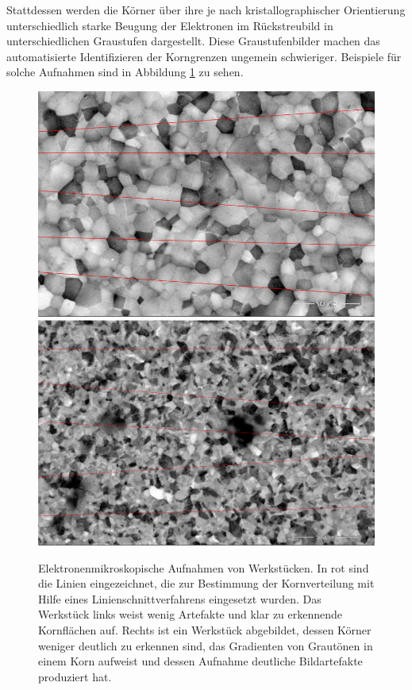\documentclass[
  12pt,
  openany]{book}
\begin{document}
Stattdessen werden die Körner über ihre je nach kristallographischer Orientierung unterschiedlich starke Beugung der Elektronen im Rückstreubild in unterschiedlichen Graustufen dargestellt. Diese Graustufenbilder machen das automatisierte Identifizieren der Korngrenzen ungemein schwieriger. Beispiele für solche Aufnahmen sind in Abbildung \ref{fig:electroGrain} zu sehen.





\begin{figure}

{\centering \includegraphics[width=.45\textwidth]{../imgs/out1} \includegraphics[width=.45\textwidth]{../imgs/out2} 

}

\caption[Elektronenmikroskopische Aufnahmen von Werkstücken.]{Elektronenmikroskopische Aufnahmen von Werkstücken. In rot sind die Linien eingezeichnet, die zur Bestimmung der Kornverteilung mit Hilfe eines Linienschnittverfahrens eingesetzt wurden. Das Werkstück links weist wenig Artefakte und klar zu erkennende Kornflächen auf. Rechts ist ein Werkstück abgebildet, dessen Körner weniger deutlich zu erkennen sind, das Gradienten von Grautönen in einem Korn aufweist und dessen Aufnahme deutliche Bildartefakte produziert hat.}\label{fig:electroGrain}
\end{figure}
\end{document}
